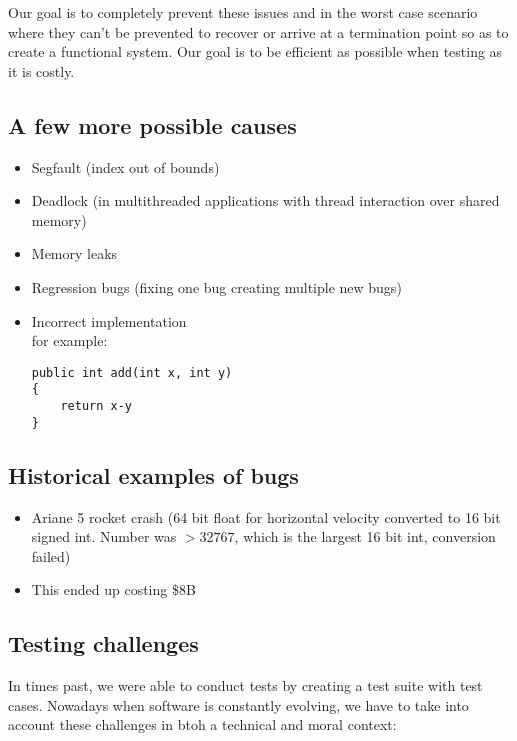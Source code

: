 \documentclass[12pt]{book}
\begin{document}
Our goal is to completely prevent these issues and in the worst case scenario where they can't be prevented to recover or arrive at a termination point so as to create a functional system. Our goal is to be efficient as possible when testing as it is costly.

\subsection*{A few more possible causes}
\begin{itemize}
  \item Segfault (index out of bounds)
  \item Deadlock (in multithreaded applications with thread interaction over shared memory)
  \item Memory leaks
  \item Regression bugs (fixing one bug creating multiple new bugs)
  \item Incorrect implementation\\for example:
\begin{lstlisting}
public int add(int x, int y)
{
    return x-y
}
\end{lstlisting}
\end{itemize}

\subsection*{Historical examples of bugs}

\begin{itemize}
  \item Ariane 5 rocket crash (64 bit float for horizontal velocity converted to 16 bit signed int. Number was $>32767$, which is the largest 16 bit int, conversion failed)
  \item This ended up costing \$8B
\end{itemize}

\subsection*{Testing challenges}

In times past, we were able to conduct tests by creating a test suite with test cases. Nowadays when software is constantly evolving, we have to take into account these challenges in btoh a technical and moral context:
\end{document}
